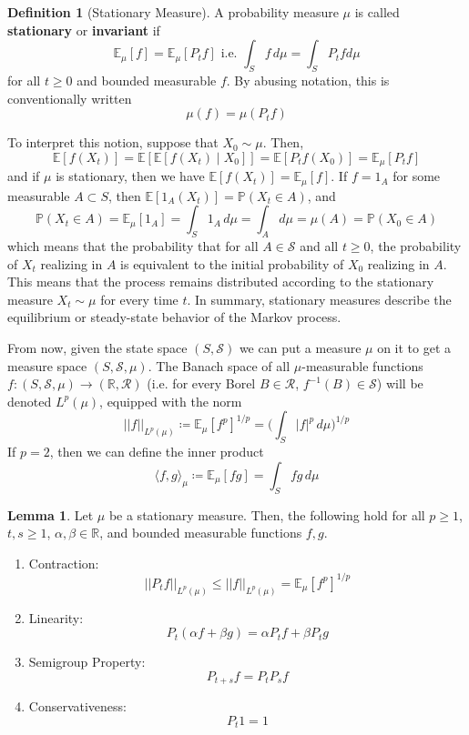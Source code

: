 \documentclass{article}
\theoremstyle{definition}
\newtheorem{lemma}[theorem]{Lemma}
\theoremstyle{remark}
\theoremstyle{definition}
\newtheorem{definition}{Definition}[section]
\begin{document}
  \begin{definition}[Stationary Measure]
  A probability measure $\mu$ is called \textbf{stationary} or \textbf{invariant} if 
  \[\mathbb{E}_\mu[f] = \mathbb{E}_\mu [P_t f] \text{ i.e. } \int_S f \,d \mu = \int_S P_t f d\mu\]
  for all $t \geq 0$ and bounded measurable $f$. By abusing notation, this is conventionally written 
  \[\mu(f) = \mu(P_t f)\]
  \end{definition}

  To interpret this notion, suppose that $X_0 \sim \mu$. Then, 
  \[\mathbb{E}[f(X_t)] = \mathbb{E}[\mathbb{E}[f(X_t) \mid X_0]] = \mathbb{E}[P_t f (X_0)] = \mathbb{E}_\mu [P_t f]\]
  and if $\mu$ is stationary, then we have $\mathbb{E}[f(X_t)] = \mathbb{E}_\mu [f]$. If $f = 1_A$ for some measurable $A \subset S$, then $\mathbb{E}[1_A (X_t)] = \mathbb{P}(X_t \in A)$, and 
  \[\mathbb{P}(X_t \in A) = \mathbb{E}_\mu [1_A] = \int_S 1_A \,d\mu = \int_A d\mu = \mu(A) = \mathbb{P}(X_0 \in A)\]
  which means that the probability that for all $A \in \mathcal{S}$ and all $t \geq 0$, the probability of $X_t$ realizing in $A$ is equivalent to the initial probability of $X_0$ realizing in $A$. This means that the process remains distributed according to the stationary measure $X_t \sim \mu$ for every time $t$. In summary, stationary measures describe the equilibrium or steady-state behavior of the Markov process.  

  From now, given the state space $(S, \mathcal{S})$ we can put a measure $\mu$ on it to get a measure space $(S, \mathcal{S}, \mu)$. The Banach space of all $\mu$-measurable functions $f: (S, \mathcal{S}, \mu) \rightarrow (\mathbb{R}, \mathcal{R})$ (i.e. for every Borel $B \in \mathcal{R}$, $f^{-1}(B) \in \mathcal{S}$) will be denoted $L^p (\mu)$, equipped with the norm 
  \[||f||_{L^p(\mu)} \coloneqq \mathbb{E}_\mu [f^p]^{1/p} = \bigg( \int_S |f|^p \,d\mu \bigg)^{1/p}\]
  If $p = 2$, then we can define the inner product 
  \[\langle f, g \rangle_\mu \coloneqq \mathbb{E}_\mu [f g] = \int_S f g \, d\mu\]

  \begin{lemma}
  Let $\mu$ be a stationary measure. Then, the following hold for all $p \geq 1$, $t, s \geq 1$, $\alpha, \beta \in \mathbb{R}$, and bounded measurable functions $f, g$. 
  \begin{enumerate}
      \item Contraction: 
      \[||P_t f||_{L^p(\mu)} \leq ||f||_{L^p (\mu)} = \mathbb{E}_\mu [f^p]^{1/p}\]
      
      \item Linearity: 
      \[P_t (\alpha f + \beta g) = \alpha P_t f + \beta P_t g\] 
      
      \item Semigroup Property: 
      \[P_{t + s} f = P_t P_s f\]
      
      \item Conservativeness: 
      \[P_t 1 = 1\]
  \end{enumerate}
  \end{lemma}
\end{document}
